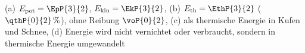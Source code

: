 (a) $E_\mathrm{pot} = \EpP{3}{2}$, $E_\mathrm{kin} = \EkP{3}{2}$, (b) $E_\mathrm{th} = \EthP{3}{2}$ ($\qthP{0}{2}\,\%$), ohne Reibung $\voP{0}{2}$, (c) als thermische Energie in Kufen und Schnee, (d) Energie wird nicht vernichtet oder verbraucht, sondern in thermische Energie umgewandelt
